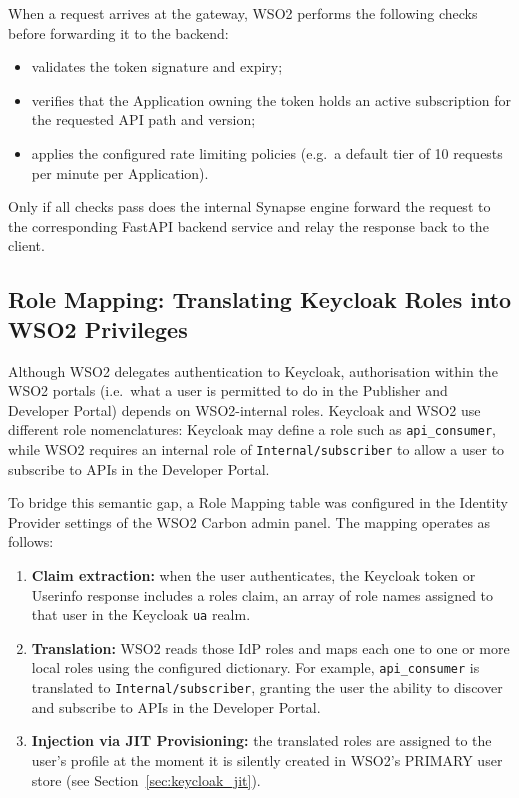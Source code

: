 \documentclass[12pt, a4paper]{report}
\begin{document}
When a request arrives at the gateway, WSO2 performs the following checks before
forwarding it to the backend:
\begin{itemize}
    \item validates the token signature and expiry;
    \item verifies that the Application owning the token holds an active subscription
          for the requested API path and version;
    \item applies the configured rate limiting policies (e.g.\ a default tier of
          10 requests per minute per Application).
\end{itemize}
Only if all checks pass does the internal Synapse engine forward the request to the
corresponding FastAPI backend service and relay the response back to the client.

\subsection{Role Mapping: Translating Keycloak Roles into WSO2 Privileges}
Although WSO2 delegates authentication to Keycloak, authorisation within the WSO2 portals
(i.e.\ what a user is permitted to do in the Publisher and Developer Portal) depends on
WSO2-internal roles. Keycloak and WSO2 use different role nomenclatures: Keycloak may
define a role such as \texttt{api\_consumer}, while WSO2 requires an internal role of
\texttt{Internal/subscriber} to allow a user to subscribe to APIs in the Developer Portal.

To bridge this semantic gap, a Role Mapping table was configured in the Identity Provider
settings of the WSO2 Carbon admin panel. The mapping operates as follows:

\begin{enumerate}
    \item \textbf{Claim extraction:} when the user authenticates, the Keycloak token or
          Userinfo response includes a roles claim, an array of role names assigned to
          that user in the Keycloak \texttt{ua} realm.
    \item \textbf{Translation:} WSO2 reads those IdP roles and maps each one to one or
          more local roles using the configured dictionary. For example,
          \texttt{api\_consumer} is translated to \texttt{Internal/subscriber}, granting
          the user the ability to discover and subscribe to APIs in the Developer Portal.
    \item \textbf{Injection via JIT Provisioning:} the translated roles are assigned to
          the user's profile at the moment it is silently created in WSO2's PRIMARY user
          store (see Section~\ref{sec:keycloak_jit}).
\end{enumerate}
\end{document}
